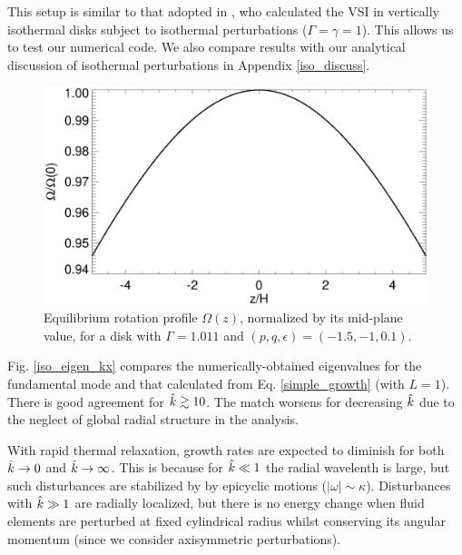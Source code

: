 This setup is similar to that adopted
in \cite{mcnally14}, who calculated the VSI in vertically isothermal
disks subject to isothermal perturbations ($\Gamma=\gamma=1$).  This
allows us to test our numerical code. We also compare results with our 
analytical discussion of isothermal perturbations in Appendix
\ref{iso_discuss}.   

\begin{figure}
  \includegraphics[width=\linewidth,clip=true,trim=0cm 0cm 0cm
  0cm]{figures/omega2} 
  \caption{Equilibrium rotation profile $\Omega(z)$,
    normalized by its mid-plane value, for a disk with $\Gamma=1.011$
    and $(p,q,\epsilon)=(-1.5,-1,0.1)$. 
    \label{omega_z} 
  }
\end{figure}



Fig. \ref{iso_eigen_kx} compares the numerically-obtained eigenvalues
for the fundamental mode and that calculated from
Eq. \ref{simple_growth} (with $L=1$). There is good agreement for  
$\hat{k}\gtrsim10$. The match worsens for decreasing $\hat{k}$ due to the
neglect of global radial structure in the analysis. 


 With rapid thermal relaxation, growth rates are expected to diminish for both $\hat{k}\to 0$
 and $\hat{k}\to \infty$. This is because for $\hat{k}\ll 1$ the radial
  wavelenth is large, but such disturbances are 
  stabilized by by epicyclic motions ($|\omega|\sim
  \kappa$). Disturbances with $\hat{k}\gg 1$ are radially localized, but  
  there is no energy change when fluid elements are perturbed at fixed
  cylindrical radius whilst conserving its angular momentum (since we
  consider axisymmetric perturbations).  


